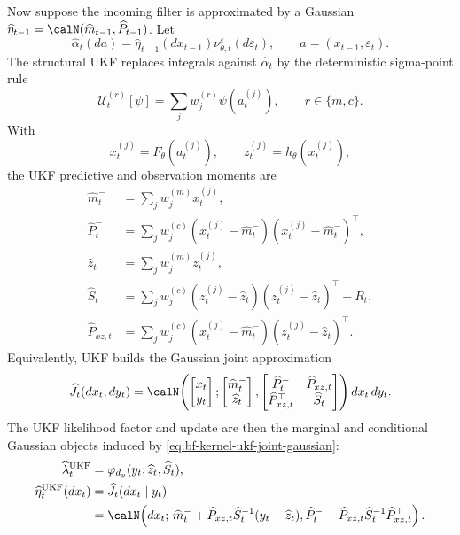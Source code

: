 Now suppose the incoming filter is approximated by a Gaussian
$\widehat\eta_{t-1}=\calN(\widehat m_{t-1},\widehat P_{t-1})$.  Let
\[
  \widehat\alpha_t(da)
  =
  \widehat\eta_{t-1}(dx_{t-1})
  \nu_{\theta,t}^{\varepsilon}(d\varepsilon_t),
  \qquad
  a=(x_{t-1},\varepsilon_t).
\]
The structural UKF replaces integrals against $\widehat\alpha_t$ by the
deterministic sigma-point rule
\[
  \mathcal U_t^{(r)}[\psi]
  =
  \sum_j w_j^{(r)}\psi(a_t^{(j)}),
  \qquad r\in\{m,c\}.
\]
With
\[
  x_t^{(j)}=F_\theta(a_t^{(j)}),
  \qquad
  z_t^{(j)}=h_\theta(x_t^{(j)}),
\]
the UKF predictive and observation moments are
\begin{align}
  \widehat m_t^-
    &=
    \sum_j w_j^{(m)}x_t^{(j)},\\
  \widehat P_t^-
    &=
    \sum_j w_j^{(c)}
    (x_t^{(j)}-\widehat m_t^-)(x_t^{(j)}-\widehat m_t^-)^\top,
    \label{eq:bf-kernel-ukf-state-moments}\\
  \widehat z_t
    &=
    \sum_j w_j^{(m)}z_t^{(j)},\\
  \widehat S_t
    &=
    \sum_j w_j^{(c)}
    (z_t^{(j)}-\widehat z_t)(z_t^{(j)}-\widehat z_t)^\top
    +R_t,\\
  \widehat P_{xz,t}
    &=
    \sum_j w_j^{(c)}
    (x_t^{(j)}-\widehat m_t^-)(z_t^{(j)}-\widehat z_t)^\top .
    \label{eq:bf-kernel-ukf-observation-moments}
\end{align}
Equivalently, UKF builds the Gaussian joint approximation
\begin{equation}
  \widehat J_t(dx_t,dy_t)
  =
  \calN\!\left(
    \begin{bmatrix}x_t\\ y_t\end{bmatrix};
    \begin{bmatrix}\widehat m_t^-\\ \widehat z_t\end{bmatrix},
    \begin{bmatrix}
      \widehat P_t^- & \widehat P_{xz,t}\\
      \widehat P_{xz,t}^\top & \widehat S_t
    \end{bmatrix}
  \right)dx_t\,dy_t .
  \label{eq:bf-kernel-ukf-joint-gaussian}
\end{equation}
The UKF likelihood factor and update are then the marginal and conditional
Gaussian objects induced by \eqref{eq:bf-kernel-ukf-joint-gaussian}:
\begin{align}
  \widehat\lambda_t^{\mathrm{UKF}}
    &=
    \varphi_{d_y}(y_t;\widehat z_t,\widehat S_t),
    \label{eq:bf-kernel-ukf-likelihood-factor}\\
  \widehat\eta_t^{\mathrm{UKF}}(dx_t)
    &=
    \widehat J_t(dx_t\mid y_t) \nonumber\\
    &=
    \calN\!\left(
      dx_t;\,
      \widehat m_t^-+
      \widehat P_{xz,t}\widehat S_t^{-1}(y_t-\widehat z_t),
      \widehat P_t^--
      \widehat P_{xz,t}\widehat S_t^{-1}\widehat P_{xz,t}^\top
    \right).
    \label{eq:bf-kernel-ukf-gaussian-update}
\end{align}
